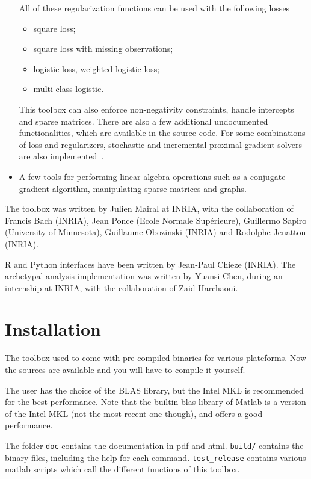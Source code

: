 \documentclass[a4paper, 11pt]{article}
\begin{document}
\begin{itemize}
\begin{itemize}
\end{itemize}
All of these regularization functions can be used with the following losses
\begin{itemize}
\item square loss;
\item square loss with missing observations;
\item logistic loss, weighted logistic loss;
\item multi-class logistic.
\end{itemize}
This toolbox can also enforce non-negativity constraints, handle intercepts and
sparse matrices.  There are also a few additional undocumented functionalities,
which are available in the source code.
For some combinations of loss and regularizers, stochastic and incremental proximal
gradient solvers are also implemented~\cite{mairal15,mairal16}.
\item A few tools for performing linear algebra operations such as a
conjugate gradient algorithm, manipulating sparse matrices and graphs.
\end{itemize}

The toolbox was written by Julien Mairal at INRIA, with the collaboration of
Francis Bach (INRIA), Jean Ponce (Ecole Normale Sup\'erieure), Guillermo Sapiro
(University of Minnesota), Guillaume Obozinski (INRIA) and Rodolphe Jenatton
(INRIA).

R and Python interfaces have been written by Jean-Paul Chieze (INRIA).
The archetypal analysis implementation was written by Yuansi Chen, during
an internship at INRIA, with the collaboration of Zaid Harchaoui.

\section{Installation}
The toolbox used to come with pre-compiled binaries for various plateforms.
Now the sources are available and you will have to compile it yourself.

The user has the choice of the BLAS library, but the Intel MKL is recommended
for the best performance. Note that the builtin blas library of Matlab is a
version of the Intel MKL (not the most recent one though), and offers
a good performance.

The folder \verb|doc| contains the documentation in pdf and html. \verb|build/|
contains the binary files, including the help for each command.
\verb|test_release| contains various matlab scripts which call the different
functions of this toolbox.
\end{document}

